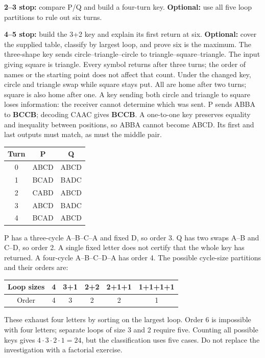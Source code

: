 \documentclass[12pt]{extarticle}
\begin{document}
\textbf{2--3 stop:} compare P/Q and build a four-turn key. \textbf{Optional:} use all five loop partitions to rule out six turns.\par
\textbf{4--5 stop:} build the 3+2 key and explain its first return at six. \textbf{Optional:} cover the supplied table, classify by largest loop, and prove six is the maximum.
\newpage
{}
The three-shape key sends circle--triangle--circle to triangle--square--triangle. The input giving square is triangle. Every symbol returns after three turns; the order of names or the starting point does not affect that count. Under the changed key, circle and triangle swap while square stays put. All are home after two turns; square is also home after one. A key sending both circle and triangle to square loses information: the receiver cannot determine which was sent.
P sends ABBA to \textbf{BCCB}; decoding CAAC gives \textbf{BCCB}. A one-to-one key preserves equality and inequality between positions, so ABBA cannot become ABCD. Its first and last outputs must match, as must the middle pair.
\begin{center}\renewcommand{\arraystretch}{1.4}\begin{tabular}{c|cc}Turn&P&Q\\\hline 0&ABCD&ABCD\\1&BCAD&BADC\\2&CABD&ABCD\\3&ABCD&BADC\\4&BCAD&ABCD\end{tabular}\end{center}
P has a three-cycle A--B--C--A and fixed D, so order 3. Q has two swaps A--B and C--D, so order 2. A single fixed letter does not certify that the whole key has returned.
A four-cycle A--B--C--D--A has order 4. The possible cycle-size partitions and their orders are:
\begin{center}\begin{tabular}{c|ccccc}Loop sizes&4&3+1&2+2&2+1+1&1+1+1+1\\\hline Order&4&3&2&2&1\end{tabular}\end{center}
These exhaust four letters by sorting on the largest loop. Order 6 is impossible with four letters; separate loops of size 3 and 2 require five. Counting all possible keys gives \(4\cdot3\cdot2\cdot1=24\), but the classification uses five cases. Do not replace the investigation with a factorial exercise.
\end{document}
